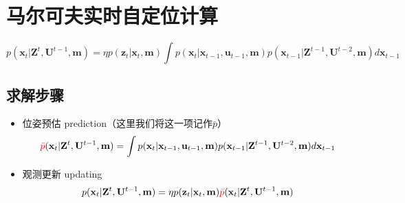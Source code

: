 \documentclass[../main.tex]{subfiles}
\begin{document}
\section{马尔可夫实时自定位计算}
$$p(\mathbf{x}_{t}|\mathbf{Z}^{t},\mathbf{U}^{t-1},\mathbf{m})=\eta p(\mathbf{z}_{t}|\mathbf{x}_{t},\mathbf{m})\int p(\mathbf{x}_{t}|\mathbf{x}_{t-1},\mathbf{u}_{t-1},\mathbf{m})p(\mathbf{x}_{t-1}|\mathbf{Z}^{t-1},\mathbf{U}^{t-2},\mathbf{m})d\mathbf{x}_{t-1}$$
\subsection{求解步骤}
\begin{itemize}
    \item 位姿预估 prediction（这里我们将这一项记作$\bar{p}$）
$$
\textcolor{red}{\bar{p}}(\mathbf{x}_{t}|\mathbf{Z}^{t},\mathbf{U}^{t-1},\mathbf{m})=\int p(\mathbf{x}_{t}|\mathbf{x}_{t-1},\mathbf{u}_{t-1},\mathbf{m})p(\mathbf{x}_{t-1}|\mathbf{Z}^{t-1},\mathbf{U}^{t-2},\mathbf{m})d\mathbf{x}_{t-1}$$
    \item 观测更新 updating
$$p(\mathbf{x}_{t}|\mathbf{Z}^{t},\mathbf{U}^{t-1},\mathbf{m})=\eta p(\mathbf{z}_{t}|\mathbf{x}_{t},\mathbf{m})\textcolor{red}{\bar{p}}(\mathbf{x}_{t}|\mathbf{Z}^{t},\mathbf{U}^{t-1},\mathbf{m})$$
\end{itemize}
{\small{}}
\end{document}
